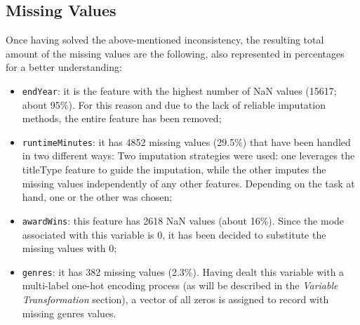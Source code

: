 \subsection{Missing Values}
Once having solved the above-mentioned inconsistency, the resulting total amount of the missing values are the following, 
also represented in percentages for a better understanding:
\begin{itemize}
    \item \texttt{endYear}: it is the feature with the highest number of NaN values (15617; about 95\%). For this reason and due to the lack of reliable imputation methods, the entire feature has been removed;
    
    \item \texttt{runtimeMinutes}: it has 4852 missing values (29.5\%) that have been handled in two
    different ways: Two imputation strategies were used: one leverages the titleType feature to guide
    the imputation,
    while the other imputes the missing values independently of any other features.
    Depending on the task at hand, one or the other was chosen;
    
    \item \texttt{awardWins}: this feature has 2618 NaN values (about 16\%). Since the mode associated with this variable is 0, it has been decided to substitute the missing values with 0;

    \item \texttt{genres}: it has 382 missing values (2.3\%). Having dealt this variable with a multi-label one-hot encoding process (as will be described in the \textit{Variable Transformation} section), a vector of all zeros is assigned to record with missing genres values.
\end{itemize}



